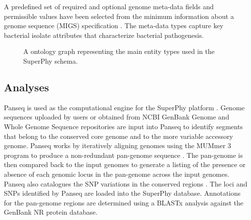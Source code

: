 \documentclass[a4paper,twoside]{article}
\begin{document}
A predefined set of required and optional genome meta-data fields and permissible values have been selected from the minimum information about a genome sequence (MIGS) specification \cite{field2008}. The meta-data types capture key bacterial isolate attributes that characterize bacterial pathogenesis.

\begin{figure}[t]
  \vspace{-0.2cm}
  \centering
   {}
  \caption{A ontology graph representing the main entity types used in the SuperPhy schema.}
  \label{fig:ontology}
\end{figure}

\subsection{Analyses}
\label{sec:pipeline}

Panseq is used as the computational engine for the SuperPhy platform \cite{laing_pan-genome_2010}. Genome sequences uploaded by users or obtained from NCBI GenBank Genome and Whole Genome Sequence repositories \cite{benson2013genbank} are input into Panseq to identify segments that belong to the conserved core genome and to the more variable accessory genome. Panseq works by iteratively aligning genomes using the MUMmer 3 program to produce a non-redundant pan-genome sequence \cite{laing_pan-genome_2010,kurtz2004versatile}. The pan-genome is then compared back to the input genomes to generate a listing of the presence or absence of each genomic locus in the pan-genome across the input genomes. Panseq also catalogues the SNP variations in the conserved regions \cite{laing_pan-genome_2010}.  The loci and SNPs identified by Panseq are loaded into the SuperPhy database. Annotations for the pan-genome regions are determined using a BLASTx analysis against the GenBank NR protein database.
\end{document}
